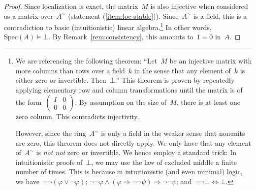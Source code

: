 \documentclass{ws-rv9x6}
\newcommand{\defeq}{\vcentcolon=}
\newcommand{\Spec}{\mathrm{Spec}}
\renewcommand{\_}{\mathpunct{.}}
\newcommand{\?}{\,{:}\,}
\newcommand{\negg}{\neg\!\!\!\neg}
\newcommand{\bott}{\bot\!\!\!\!\bot}
\begin{document}
\begin{proof}Since localization is exact, the matrix~$M$ is also injective when
considered as a matrix over~$A^\sim$ (statement (\ref{item:loc-stable})).
Since~$A^\sim$ is a field, this is a contradiction to basic (intuitionistic)
linear algebra.\footnote{We are referencing the following theorem: ``Let~$M$ be
an injective matrix with more columns than rows over a field~$k$ in the sense
that any element of~$k$ is either zero or invertible. Then~$\bot$.'' This
theorem is proven by repeatedly applying elementary row and column
transformations until the matrix is of the
form~$\left(\begin{smallmatrix}I&0\\0&0\end{smallmatrix}\right)$. By assumption
on the size of~$M$, there is at least one zero column. This contradicts
injectivity.

However, since the ring~$A^\sim$ is only a field in the weaker sense that
nonunits are zero, this theorem does not directly apply. We only have that any
element of~$A^\sim$ is \emph{not not} zero or invertible. We hence employ a
standard trick: In intuitionistic proofs of~$\bot$, we may use the law of
excluded middle a finite number of times. This is because in intuitionistic
(and even minimal) logic, we have~$\neg\neg(\varphi \vee \neg\varphi)$;
$\neg\neg\varphi \wedge (\varphi \Rightarrow \neg\neg\psi) \Longrightarrow
\neg\neg\psi$; and~$\neg\neg\bot \Leftrightarrow \bot$.}
In other words, $\Spec(A) \models \bot$. By
Remark~\ref{rem:consistency}, this amounts to~$1 = 0$ in~$A$.
\end{proof}

%
%
%
%
\end{document}
